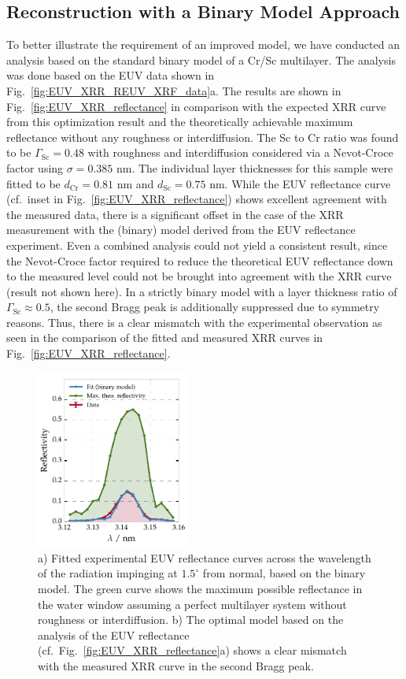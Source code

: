 \subsection{Reconstruction with a Binary Model Approach}
To better illustrate the requirement of an improved model, we have conducted an 
analysis based on the standard binary model of a Cr/Sc multilayer. The analysis 
was done based on the EUV data shown in Fig.~\ref{fig:EUV_XRR_REUV_XRF_data}a. 
The results are shown in Fig.~\ref{fig:EUV_XRR_reflectance} in comparison with 
the expected XRR curve from this optimization result and the theoretically 
achievable maximum reflectance without any roughness or interdiffusion. The Sc 
to Cr ratio was found to be $\Gamma_\text{Sc}=0.48$ with roughness and 
interdiffusion considered via a Nevot-Croce factor using $\sigma=0.385$ nm. The 
individual layer thicknesses for this sample were fitted to be $d_\text{Cr} = 
0.81$ nm and $d_\text{Sc}= 0.75$ nm. While the EUV reflectance curve (cf.~inset 
in Fig.~\ref{fig:EUV_XRR_reflectance}) shows excellent agreement with the 
measured data, there is a significant offset in the case of the XRR measurement 
with the (binary) model derived from the EUV reflectance experiment. Even a 
combined analysis could not yield a consistent result, since the Nevot-Croce 
factor required to reduce the theoretical EUV reflectance down to the measured 
level could not be brought into agreement with the XRR curve (result not shown 
here). In a strictly binary model with a layer thickness ratio of 
$\Gamma_\text{Sc}\approx 0.5$, the second Bragg peak is additionally suppressed 
due to symmetry reasons. Thus, there is a clear mismatch with the experimental 
observation as seen in the comparison of the fitted and measured XRR curves in 
Fig.~\ref{fig:EUV_XRR_reflectance}.
\begin{figure}[htbp]
  \centering
  \includegraphics[width=0.45\textwidth]{img/CrSc_binary_fit_vs_max_refl}
  \caption{a) Fitted experimental EUV reflectance curves across the wavelength 
of the radiation impinging at $1.5^\circ$ from normal, based on the binary 
model. The green curve shows the maximum possible reflectance in the water 
window assuming a perfect multilayer system without roughness or 
interdiffusion. b) The optimal model based on the analysis of the EUV 
reflectance (cf.~Fig.~\ref{fig:EUV_XRR_reflectance}a) shows a clear mismatch 
with the measured XRR curve in the second Bragg peak.
}
  \label{ch_spec:fig_CrSc_binary_fit_vs_max_refl}
\end{figure}


